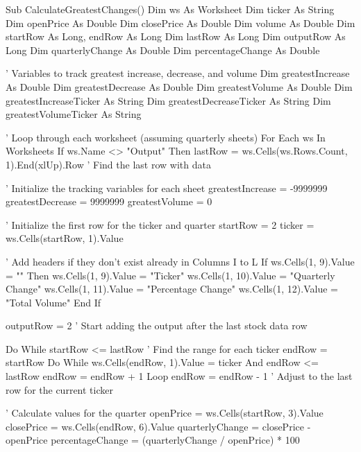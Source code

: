 Sub CalculateGreatestChanges()
    Dim ws As Worksheet
    Dim ticker As String
    Dim openPrice As Double
    Dim closePrice As Double
    Dim volume As Double
    Dim startRow As Long, endRow As Long
    Dim lastRow As Long
    Dim outputRow As Long
    Dim quarterlyChange As Double
    Dim percentageChange As Double

    ' Variables to track greatest increase, decrease, and volume
    Dim greatestIncrease As Double
    Dim greatestDecrease As Double
    Dim greatestVolume As Double
    Dim greatestIncreaseTicker As String
    Dim greatestDecreaseTicker As String
    Dim greatestVolumeTicker As String
    
    ' Loop through each worksheet (assuming quarterly sheets)
    For Each ws In Worksheets
        If ws.Name <> "Output" Then
            lastRow = ws.Cells(ws.Rows.Count, 1).End(xlUp).Row ' Find the last row with data
            
            ' Initialize the tracking variables for each sheet
            greatestIncrease = -9999999
            greatestDecrease = 9999999
            greatestVolume = 0
            
            ' Initialize the first row for the ticker and quarter
            startRow = 2
            ticker = ws.Cells(startRow, 1).Value
            
            ' Add headers if they don't exist already in Columns I to L
            If ws.Cells(1, 9).Value = "" Then
                ws.Cells(1, 9).Value = "Ticker"
                ws.Cells(1, 10).Value = "Quarterly Change"
                ws.Cells(1, 11).Value = "Percentage Change"
                ws.Cells(1, 12).Value = "Total Volume"
            End If
            
            outputRow = 2 ' Start adding the output after the last stock data row
            
            Do While startRow <= lastRow
                ' Find the range for each ticker
                endRow = startRow
                Do While ws.Cells(endRow, 1).Value = ticker And endRow <= lastRow
                    endRow = endRow + 1
                Loop
                endRow = endRow - 1 ' Adjust to the last row for the current ticker
                
                ' Calculate values for the quarter
                openPrice = ws.Cells(startRow, 3).Value
                closePrice = ws.Cells(endRow, 6).Value
                quarterlyChange = closePrice - openPrice
                percentageChange = (quarterlyChange / openPrice) * 100
                

